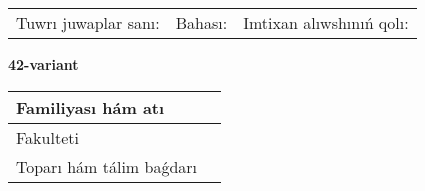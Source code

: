 \documentclass{article}
\begin{document}
\vspace{1cm}

\begin{tabular}{lll}
Tuwrı juwaplar sanı: \underline{\hspace{1.5cm}} & 
Bahası: \underline{\hspace{1.5cm}} & 
Imtixan alıwshınıń qolı: \underline{\hspace{2cm}} \\
\end{tabular}

\egroup

\newpage


\textbf{42-variant}\\

\bgroup
\def\arraystretch{1.6} %

\begin{tabular}{|m{5.7cm}|m{9.5cm}|}
\hline
Familiyası hám atı & \\
\hline
Fakulteti  & \\
\hline
Toparı hám tálim baǵdarı  & \\
\hline
\end{tabular}

\vspace{1cm}
\end{document}
